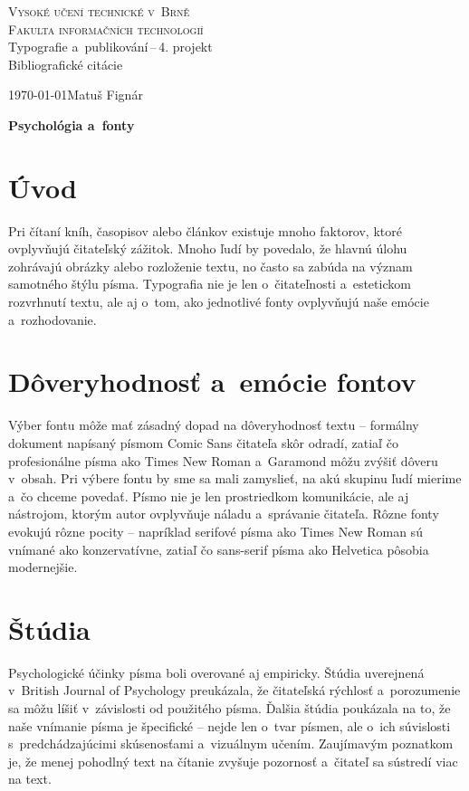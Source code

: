 \documentclass[a4paper, 11pt]{article}
\begin{document}
\begin{titlepage}
    \begin{center}
        \textsc{\Huge{Vysoké učení technické v~Brně\\[0.4em]}
        \huge{Fakulta informačních technologií}}\\        
        \LARGE{Typografie a~publikování\,--\,4. projekt}\\
        \Huge{Bibliografické citácie}\\ %
    \end{center}
    \Large{\today\hfill Matuš Fignár}
\end{titlepage}

\begin{center}
    \Huge{\textbf{Psychológia a~fonty}}
\end{center}

\section{Úvod}
Pri čítaní kníh, časopisov alebo článkov existuje mnoho faktorov, ktoré ovplyvňujú čitateľský zážitok. Mnoho ľudí by 
povedalo, že hlavnú úlohu zohrávajú obrázky alebo rozloženie textu, no často sa zabúda na význam samotného štýlu písma. 
Typografia nie je len o~čitateľnosti a~estetickom rozvrhnutí textu, ale aj o~tom, ako jednotlivé fonty ovplyvňujú 
naše emócie a~rozhodovanie.\cite{lupton}

\section{Dôveryhodnosť a~emócie fontov}
Výber fontu môže mať zásadný dopad na dôveryhodnosť textu – 
formálny dokument napísaný písmom Comic Sans čitateľa skôr 
odradí, zatiaľ čo profesionálne písma ako Times New Roman a~Garamond môžu zvýšiť dôveru v~obsah.\cite{designmodo}
Pri výbere fontu by sme sa mali zamyslieť, na akú skupinu ľudí mierime a~čo chceme povedať. 
Písmo nie je len prostriedkom komunikácie, ale aj nástrojom, 
ktorým autor ovplyvňuje náladu a~správanie čitateľa.
Rôzne fonty evokujú rôzne pocity – napríklad serifové 
písma ako Times New Roman sú vnímané ako konzervatívne, zatiaľ čo sans-serif písma ako Helvetica pôsobia 
modernejšie.\cite{garfield} 

\section{Štúdia}
Psychologické účinky písma boli overované aj empiricky. Štúdia uverejnená v~British Journal of Psychology
preukázala, že čitateľská rýchlosť a~porozumenie sa môžu líšiť v~závislosti od použitého písma.\cite{BPS}
Ďalšia štúdia poukázala na to, že naše vnímanie písma je špecifické – nejde len o~tvar písmen, ale o~ich súvislosti s~predchádzajúcimi 
skúsenosťami a~vizuálnym učením.\cite{dyson} Zaujímavým poznatkom je, že menej pohodlný text na čítanie zvyšuje pozornosť a~čitateľ sa
sústredí viac na text.\cite{oppenheimer}
\end{document}

